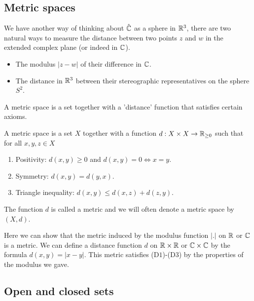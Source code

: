 \documentclass[10pt, a4paper]{article}
\begin{document}
\subsection{Metric spaces}
We have another way of thinking about $\hat{\mathbb{C}}$ as a sphere in $\mathbb{R} ^ 3$,
there are two natural ways to measure the distance between two points $z$ and $w$ in the extended complex plane
(or indeed in $\mathbb{C}$).
\begin{itemize}
    \item The modulus $|z - w|$ of their difference in $\mathbb{C}$.

    \item The distance in $\mathbb{R} ^ 3$ between their stereographic representatives on the sphere $S ^ 2$.
\end{itemize}

A metric space is a set together with a 'distance' function that satisfies certain axioms.
\begin{definition}
    A metric space is a set $X$ together with a function $d : X \times X \to \mathbb{R}_{\geq 0}$ such that for all $x, y, z \in X$
    \begin{enumerate}[label = (D\arabic*)]
        \item Positivity:
        $d(x, y) \geq 0$ and $d(x, y) = 0 \iff x = y$.

        \item Symmetry:
        $d(x, y) = d(y, x)$.

        \item Triangle inequality:
        $d(x, y) \leq d(x, z) + d(z, y)$.
    \end{enumerate}

    The function $d$ is called a metric and we will often denote a metric space by $(X, d)$.
\end{definition}

\begin{example}
    Here we can show that the metric induced by the modulus function $|.|$ on $\mathbb{R}$ or $\mathbb{C}$ is a metric.
    We can define a distance function $d$ on $\mathbb{R} \times \mathbb{R}$ or $\mathbb{C} \times \mathbb{C}$ by the formula $d(x, y) = |x - y|$.
    This metric satisfies
    (D$1$)-(D$3$)
    by the properties of the modulus we gave.
\end{example}

\subsection{Open and closed sets}
\end{document}
